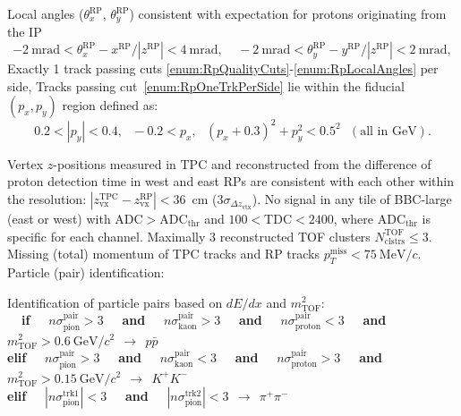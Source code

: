 \begin{enumerate}[label=\textbf{C\arabic*},ref=C\arabic*]
\begin{enumerate}[label=\textbf{\theenumi.\arabic*},ref=\theenumi.\arabic*]
      \itemm Local angles ($\theta_{x}^{\text{RP}}$, $\theta_{y}^{\text{RP}}$) consistent with expectation for protons originating from the IP\label{enum:RpLocalAngles}%
      \[-2~\text{mrad}<\theta_{x}^{\text{RP}}-x^{\text{RP}}/|z^{\text{RP}}|<4~\text{mrad},~~~~~-2~\text{mrad}<\theta_{y}^{\text{RP}}-y^{\text{RP}}/|z^{\text{RP}}|<2~\text{mrad},\]
      \itemm Exactly 1 track passing cuts \ref{enum:RpQualityCuts}-\ref{enum:RpLocalAngles} per side,\label{enum:RpOneTrkPerSide}
      \itemm Tracks passing cut~\ref{enum:RpOneTrkPerSide} lie within the fiducial $(p_{x},p_{y})$ region defined as\label{enum:RpFiducial}:\\
      \[0.2<|p_{y}|<0.4,~~~-0.2<p_{x},~~~(p_{x}+0.3)^{2}+p_{y}^{2}<0.5^{2}~~~(\text{all in GeV}).\]
    \end{enumerate}
 \itemm Vertex $z$-positions measured in TPC and reconstructed from the difference of proton detection time in west and east RPs are consistent with each other within the resolution: $|z_{\text{vx}}^{\text{TPC}}-z_{\text{vx}}^{\text{RP}}|<36$~cm ($3\sigma_{\Delta z_{\text{vtx}}}$).\label{enum:CutDeltaZVx}
 \itemm No signal in any tile of BBC-large (east or west) with $\text{ADC}>\text{ADC}_{\text{thr}}$ and $100<\text{TDC}<2400$, where $\text{ADC}_{\text{thr}}$ is specific for each channel.\label{enum:CutBbcLarge}%
 \itemm Maximally 3 reconstructed TOF clusters $N^{\text{TOF}}_{\text{clstrs}}\leq 3$.\label{enum:CutTofClusters}%
 \itemm Missing (total) momentum of TPC tracks and RP tracks $p_{T}^{\text{miss}}<75~\text{MeV}/c$.\label{enum:CutMissingPt}%
 \itemm Particle (pair) identification:\label{enum:CutPid}
 \begin{enumerate}[label=\textbf{\theenumi.\arabic*},ref=\theenumi.\arabic*]
      \itemm Identification of particle pairs based on $dE/dx$ and $m^{2}_{\text{TOF}}$:\\[2pt]
        \textbf{~~if~~} $n\sigma_{\text{pion}}^{\text{pair}}>3$ \textbf{~~and~~} $n\sigma_{\text{kaon}}^{\text{pair}}>3$ \textbf{~~and~~} $n\sigma_{\text{proton}}^{\text{pair}}<3$ \textbf{~~and~~} $m^{2}_{\text{TOF}}>0.6~\text{GeV}/c^{2}~~\rightarrow~~p\bar{p}$\\%
        \textbf{elif~~} $n\sigma_{\text{pion}}^{\text{pair}}>3$ \textbf{~~and~~} $n\sigma_{\text{kaon}}^{\text{pair}}<3$ \textbf{~~and~~} $n\sigma_{\text{proton}}^{\text{pair}}>3$ \textbf{~~and~~} $m^{2}_{\text{TOF}}>0.15~\text{GeV}/c^{2}~~\rightarrow~~K^{+}K^{-}$\\%
        \textbf{elif~~} $|n\sigma_{\text{pion}}^{\text{trk1}}|<3$ \textbf{~~and~~} $|n\sigma_{\text{pion}}^{\text{trk2}}|<3~~\rightarrow~~\pi^{+}\pi^{-}$\\%

\end{enumerate}
\end{enumerate}
